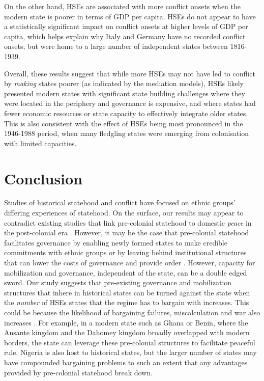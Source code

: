 On the other hand, HSEs are associated with more conflict onsets when the modern
state is poorer in terms of GDP per capita. HSEs do not appear to have a
statistically significant impact on conflict onsets at higher levels of GDP per
capita, which helps explain why Italy and Germany have no recorded conflict
onsets, but were home to a large number of independent states between 1816-1939. 

Overall, these results suggest that while more HSEs may not have led to conflict
by \textit{making} states poorer (as indicated by the mediation models), HSEs
likely presented modern states with significant state building challenges where
they were located in the periphery and governance is expensive, and where states
had fewer economic resources or state capacity to effectively integrate older
states. This is also consistent with the effect of HSEs being most pronounced in
the 1946-1988 period, when many fledgling states were emerging from
colonisation with limited capacities.

\section{Conclusion}

Studies of historical statehood and conflict have focused on ethnic groups'
differing experiences of statehood. On the surface, our results may appear to
contradict existing studies that link pre-colonial statehood to domestic
\emph{peace} in   the post-colonial era \citep{Wig2016, Depetris-Chauvin2016}.
However, it may be the case that pre-colonial statehood facilitates governance
by enabling newly formed states to make credible commitments with ethnic groups
\citep{Wig2016} or by leaving behind institutional structures that can lower the
costs of governance and provide order \citep{Depetris-Chauvin2016}. However,
capacity for mobilization and governance, independent of the state, can be a
double edged sword. Our study suggests that pre-existing governance and
mobilization structures that inhere in historical states can be turned against
the state when the  \emph{number} of HSEs states that the regime has to bargain
with increases. This could be because the likelihood of bargaining failures,
miscalculation and war also increases \citep{Fearon1995, Walter2009,
Cunningham2006}. For example, in a modern state such as Ghana or Benin, where
the Ansante kingdom and the Dahomey kingdom broadly overlapped with modern
borders, the state can leverage these pre-colonial structures to facilitate
peaceful rule. Nigeria is also host to historical states, but the larger number
of states may have compounded bargaining problems to such an extent that any
advantages provided by pre-colonial statehood break down. 

